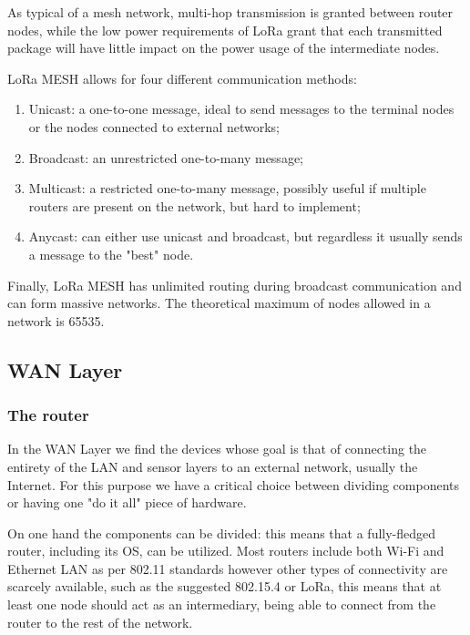 \documentclass[11pt]{article}
\begin{document}
As typical of a mesh network, multi-hop transmission is granted between router nodes, while the low power requirements of LoRa grant that each transmitted package will have little impact on the power usage of the intermediate nodes. \par \vspace{0.5 cm}

LoRa MESH allows for four different communication methods: 
\begin{enumerate}
    \item Unicast: a one-to-one message, ideal to send messages to the terminal nodes or the nodes connected to external networks;
    \item Broadcast: an unrestricted one-to-many message;
    \item Multicast: a restricted one-to-many message, possibly useful if multiple routers are present on the network, but hard to implement;
    \item Anycast: can either use unicast and broadcast, but regardless it usually sends a message to the "best" node.
\end{enumerate}

Finally, LoRa MESH has unlimited routing during broadcast communication and can form massive networks. The theoretical maximum of nodes allowed in a network is 65535. \par \vspace{0.5 cm}

\subsection{WAN Layer}
\subsubsection{The router}
In the WAN Layer we find the devices whose goal is that of connecting the entirety of the LAN and sensor layers to an external network, usually the Internet. For this purpose we have a critical choice between dividing components or having one "do it all" piece of hardware. \par \vspace{0.5 cm}

On one hand the components can be divided: this means that a fully-fledged router, including its OS, can be utilized. Most routers include both Wi-Fi and Ethernet LAN as per 802.11 standards however other types of connectivity are scarcely available, such as the suggested 802.15.4 or LoRa, this means that at least one node should act as an intermediary, being able to connect from the router to the rest of the network. \par \vspace{0.5 cm}
\end{document}
